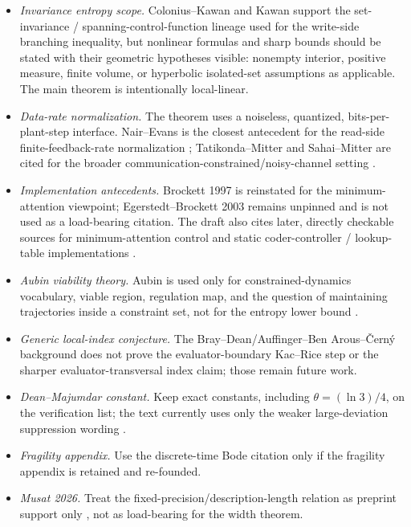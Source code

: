 \documentclass[11pt]{article}
\theoremstyle{definition}
\theoremstyle{remark}
\begin{document}
\begin{itemize}
\item \emph{Invariance entropy scope.} Colonius--Kawan and Kawan \cite{colonius2009,kawan2013} support the set-invariance / spanning-control-function lineage used for the write-side branching inequality, but nonlinear formulas and sharp bounds should be stated with their geometric hypotheses visible: nonempty interior, positive measure, finite volume, or hyperbolic isolated-set assumptions as applicable. The main theorem is intentionally local-linear.
\item \emph{Data-rate normalization.} The theorem uses a noiseless, quantized, bits-per-plant-step interface. Nair--Evans is the closest antecedent for the read-side finite-feedback-rate normalization \cite{nair2000}; Tatikonda--Mitter and Sahai--Mitter are cited for the broader communication-constrained/noisy-channel setting \cite{tatikonda2004,sahai2006}.
\item \emph{Implementation antecedents.} Brockett 1997 is reinstated for the minimum-attention viewpoint; Egerstedt--Brockett 2003 remains unpinned and is not used as a load-bearing citation. The draft also cites later, directly checkable sources for minimum-attention control and static coder-controller / lookup-table implementations \cite{brockett1997,lee2022,donkers2014,tomar2022}.
\item \emph{Aubin viability theory.} Aubin is used only for constrained-dynamics vocabulary, viable region, regulation map, and the question of maintaining trajectories inside a constraint set, not for the entropy lower bound \cite{aubin1991}.
\item \emph{Generic local-index conjecture.} The Bray--Dean/Auffinger--Ben Arous--\v{C}ern\'y background \cite{bray2007,auffinger2013} does not prove the evaluator-boundary Kac--Rice step or the sharper evaluator-transversal index claim; those remain future work.
\item \emph{Dean--Majumdar constant.} Keep exact constants, including $\theta=(\ln3)/4$, on the verification list; the text currently uses only the weaker large-deviation suppression wording \cite{dean2006}.
\item \emph{Fragility appendix.} Use the discrete-time Bode citation \cite{mohtadi1990} only if the fragility appendix is retained and re-founded.
\item \emph{Musat 2026.} Treat the fixed-precision/description-length relation as preprint support only \cite{musat2026}, not as load-bearing for the width theorem.

\end{itemize}
\end{document}
